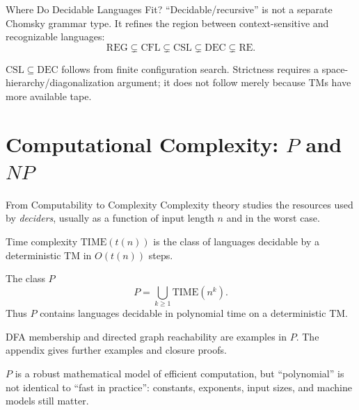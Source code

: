 \documentclass[10pt]{beamer}
\newcommand{\RE}{\mathrm{RE}}
\begin{document}
\begin{frame}{Where Do Decidable Languages Fit?}
  \small
  ``Decidable/recursive'' is not a separate Chomsky grammar type. It refines the region between
  context-sensitive and recognizable languages:
  \[
    \mathrm{REG}\subsetneq\mathrm{CFL}\subsetneq\mathrm{CSL}
    \subsetneq\mathrm{DEC}\subsetneq\RE.
  \]
  \begin{center}
  \end{center}
  $\mathrm{CSL}\subseteq\mathrm{DEC}$ follows from finite configuration
  search. Strictness requires a space-hierarchy/diagonalization argument;
  it does not follow merely because TMs have more available tape.
\end{frame}

\section{Computational Complexity: \texorpdfstring{$P$ and $NP$}{P and NP}}

\begin{frame}{From Computability to Complexity}
  \small
  Complexity theory studies the resources used by \emph{deciders}, usually as a function of input
  length $n$ and in the worst case.
  \begin{block}{Time complexity}
    $\mathrm{TIME}(t(n))$ is the class of languages decidable by a deterministic TM in
    $O(t(n))$ steps.
  \end{block}
  \begin{block}{The class $P$}
    \[
      P=\bigcup_{k\ge1}\mathrm{TIME}(n^k).
    \]
    Thus $P$ contains languages decidable in polynomial time on a deterministic TM.
  \end{block}
  DFA membership and directed graph reachability are examples in $P$.
  The appendix gives further examples and closure proofs.
  \par\smallskip
  $P$ is a robust mathematical model of efficient computation, but ``polynomial'' is not identical
  to ``fast in practice'': constants, exponents, input sizes, and machine models still matter.
\end{frame}
\end{document}
